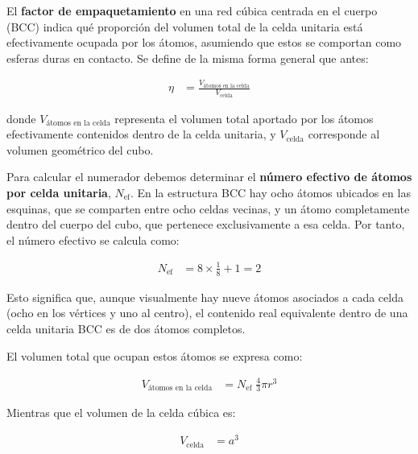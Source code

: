 \documentclass{article}
\begin{document}
El \textcolor{Cerulean}{\textbf{factor de empaquetamiento}} en una red cúbica centrada en el cuerpo (BCC) indica qué proporción del volumen total de la celda unitaria está efectivamente ocupada por los átomos, asumiendo que estos se comportan como esferas duras en contacto.  
Se define de la misma forma general que antes:

\begin{equation}
\begin{split}
\eta &= \frac{V_{\text{átomos en la celda}}}{V_{\text{celda}}}
\end{split} \label{eq:def-factor-bcc}
\end{equation}

donde \(V_{\text{átomos en la celda}}\) representa el volumen total aportado por los átomos efectivamente contenidos dentro de la celda unitaria, y \(V_{\text{celda}}\) corresponde al volumen geométrico del cubo.

Para calcular el numerador debemos determinar el \textbf{número efectivo de átomos por celda unitaria}, \(N_{\text{ef}}\).  
En la estructura BCC hay ocho átomos ubicados en las esquinas, que se comparten entre ocho celdas vecinas, y un átomo completamente dentro del cuerpo del cubo, que pertenece exclusivamente a esa celda.  
Por tanto, el número efectivo se calcula como:

\begin{equation}
\begin{split}
N_{\text{ef}} &= 8\times\frac{1}{8} + 1 = 2
\end{split} \label{eq:nef-bcc}
\end{equation}

Esto significa que, aunque visualmente hay nueve átomos asociados a cada celda (ocho en los vértices y uno al centro), el contenido real equivalente dentro de una celda unitaria BCC es de dos átomos completos.

El volumen total que ocupan estos átomos se expresa como:

\begin{equation}
\begin{split}
V_{\text{átomos en la celda}} &= N_{\text{ef}}\;\frac{4}{3}\pi r^{3}
\end{split} \label{eq:vol-atomos-bcc}
\end{equation}

Mientras que el volumen de la celda cúbica es:

\begin{equation}
\begin{split}
V_{\text{celda}} &= a^{3}
\end{split} \label{eq:vol-celda-bcc}
\end{equation}
\end{document}

